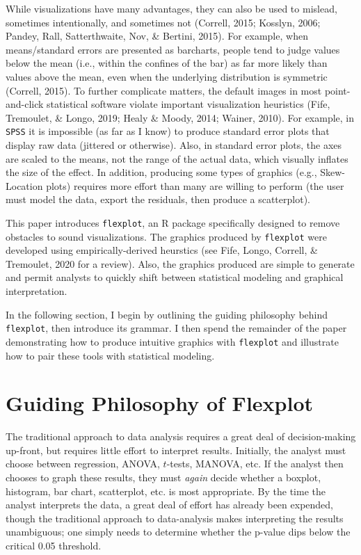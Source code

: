 \documentclass[
  english,
  man]{apa6}
\begin{document}
While visualizations have many advantages, they can also be used to mislead, sometimes intentionally, and sometimes not (Correll, 2015; Kosslyn, 2006; Pandey, Rall, Satterthwaite, Nov, \& Bertini, 2015). For example, when means/standard errors are presented as barcharts, people tend to judge values below the mean (i.e., within the confines of the bar) as far more likely than values above the mean, even when the underlying distribution is symmetric (Correll, 2015). To further complicate matters, the default images in most point-and-click statistical software violate important visualization heuristics (Fife, Tremoulet, \& Longo, 2019; Healy \& Moody, 2014; Wainer, 2010). For example, in \texttt{SPSS} it is impossible (as far as I know) to produce standard error plots that display raw data (jittered or otherwise). Also, in standard error plots, the axes are scaled to the means, not the range of the actual data, which visually inflates the size of the effect. In addition, producing some types of graphics (e.g., Skew-Location plots) requires more effort than many are willing to perform (the user must model the data, export the residuals, then produce a scatterplot).

This paper introduces \texttt{flexplot}, an R package specifically designed to remove obstacles to sound visualizations. The graphics produced by \texttt{flexplot} were developed using empirically-derived heurstics (see Fife, Longo, Correll, \& Tremoulet, 2020 for a review). Also, the graphics produced are simple to generate and permit analysts to quickly shift between statistical modeling and graphical interpretation.

In the following section, I begin by outlining the guiding philosophy behind \texttt{flexplot}, then introduce its grammar. I then spend the remainder of the paper demonstrating how to produce intuitive graphics with \texttt{flexplot} and illustrate how to pair these tools with statistical modeling.

\hypertarget{guiding-philosophy-of-flexplot}{%
\section{Guiding Philosophy of Flexplot}\label{guiding-philosophy-of-flexplot}}

The traditional approach to data analysis requires a great deal of decision-making up-front, but requires little effort to interpret results. Initially, the analyst must choose between regression, ANOVA, \(t\)-tests, MANOVA, etc. If the analyst then chooses to graph these results, they must \emph{again} decide whether a boxplot, histogram, bar chart, scatterplot, etc. is most appropriate. By the time the analyst interprets the data, a great deal of effort has already been expended, though the traditional approach to data-analysis makes interpreting the results unambiguous; one simply needs to determine whether the p-value dips below the critical 0.05 threshold.
\end{document}

